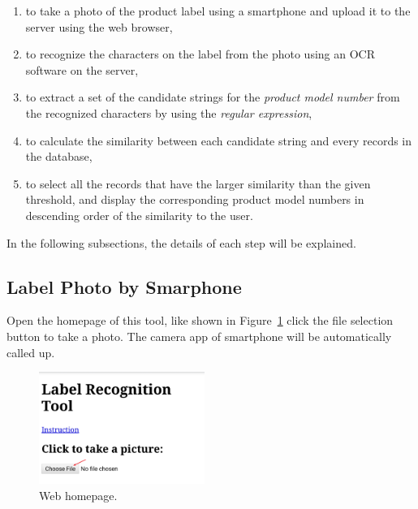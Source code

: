 \documentclass[technicalreport]{ieicej}
\begin{document}
        \begin{enumerate}
            \item to take a photo of the product label using a smartphone and upload it to the server using the web browser,
            \item to recognize the characters on the label from the photo using an OCR software on the server,
            \item to extract a set of the candidate strings for the {\em product model number} from the recognized characters by using the {\em regular expression}, 
            \item to calculate the similarity between each candidate string and every records in the database,
            \item to select all the records that have the larger similarity than the given threshold, and display the corresponding product model numbers in descending order of the similarity to the user. 
        \end{enumerate}

        In the following subsections, the details of each step will be explained.

    \subsection{Label Photo by Smarphone}
    \label{sec:label-requirement}
        Open the homepage of this tool, like shown in Figure~\ref{fig:homepage} click the file selection button to take a photo. The camera app of smartphone will be automatically called up.

        \begin{figure}[t] 
            \begin{center}
            \includegraphics[width=0.48\textwidth]{figure/homepage.png}
            \end{center}
            \caption{Web homepage.}
            \label{fig:homepage}
        \end{figure}
\end{document}
